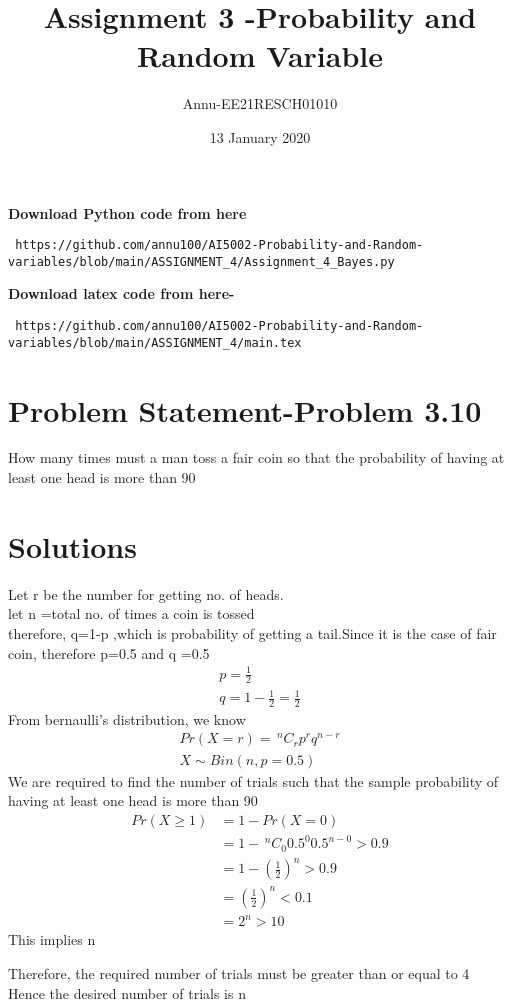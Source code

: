 \documentclass[journel,12pt,twocoloums]{IEEEtran}
\title{Assignment 3 -Probability and Random Variable}
\author{Annu-EE21RESCH01010}
\date{13 January 2020}
\providecommand{\nCr}[2]{\,^{#1}C_{#2}}
\begin{document}
 \maketitle
 \textbf{Download Python code from here}\\
\begin{lstlisting}
 https://github.com/annu100/AI5002-Probability-and-Random-variables/blob/main/ASSIGNMENT_4/Assignment_4_Bayes.py
 \end{lstlisting}
\textbf{Download latex code from here-}\\
\begin{lstlisting}
 https://github.com/annu100/AI5002-Probability-and-Random-variables/blob/main/ASSIGNMENT_4/main.tex
 \end{lstlisting}
 \section{Problem Statement-Problem 3.10}
How many times must a man toss a fair coin
so that the probability of having at least one
head is more than 90%
\section{Solutions}

Let r be the number for getting no. of  heads. \\
let n =total no. of times a coin is tossed\\
therefore, q=1-p ,which is probability of getting a tail.Since it is the case of fair coin, therefore p=0.5 and q =0.5\\
\begin{align}
    p=\frac{1}{2} \\
    q=1-\frac{1}{2}=\frac{1}{2}
\end{align}
From bernaulli's distribution, we know\\
\begin{align}
    Pr(X=r)= \nCr{n}{r} p^r q^{n-r}  \\
    X \sim Bin(n,p=0.5)
\end{align}
We are required to find the number of trials such that the sample  probability of having at least one
head is more than 90%
\begin{align}
    Pr(X \ge 1) &=1-Pr(X=0)\\
                &=1-\nCr{n}{0} 0.5^0 0.5^{n-0} >0.9 \\
                &=1-(\frac{1}{2})^n >0.9\\
                &=(\frac{1}{2})^n < 0.1\\
                &= 2^{n} >10
\end{align}
This implies n 


Therefore, the required number of trials must be greater than or equal to 4\\


Hence the desired number of trials is n
            
\end{document}
